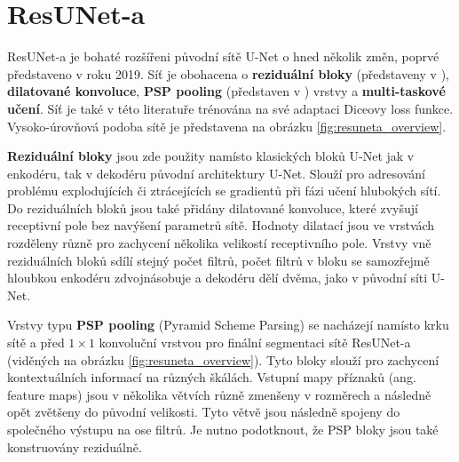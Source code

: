 \section{ResUNet-a}
\label{sec:Chapter25}

ResUNet-a je bohaté rozšířeni původní sítě U-Net o hned několik změn, poprvé představeno v \cite{resuneta} roku 2019. Síť je obohacena o \textbf{reziduální bloky} (představeny v \cite{residualblocks}), \textbf{dilatované konvoluce}, \textbf{PSP pooling} (představen v \cite{psp}) vrstvy a \textbf{multi-taskové učení}. Síť je také v této literatuře trénována na své adaptaci Diceovy loss funkce. Vysoko-úrovňová podoba sítě je představena na obrázku \ref{fig:resuneta_overview}.

\textbf{Reziduální bloky} jsou zde použity namísto klasických bloků U-Net jak v enkodéru, tak v dekodéru původní architektury U-Net. Slouží pro adresování problému explodujících či ztrácejících se gradientů při fázi učení hlubokých sítí. Do reziduálních bloků jsou také přidány dilatované konvoluce, které zvyšují receptivní pole bez navýšení parametrů sítě. Hodnoty dilatací jsou ve vrstvách rozděleny různě pro zachycení několika velikostí receptivního pole. Vrstvy vně reziduálních bloků sdílí stejný počet filtrů, počet filtrů v bloku se samozřejmě hloubkou enkodéru zdvojnásobuje a dekodéru dělí dvěma, jako v původní síti U-Net.

Vrstvy typu \textbf{PSP pooling} (Pyramid Scheme Parsing) se nacházejí namísto krku sítě a před $1\times1$ konvoluční vrstvou pro finální segmentaci sítě ResUNet-a (viděných na obrázku \ref{fig:resuneta_overview}). Tyto bloky slouží pro zachycení kontextuálních informací na různých škálách. Vstupní mapy příznaků (ang. feature maps) jsou v několika větvích různě zmenšeny v rozměrech a následně opět zvětšeny do původní velikosti. Tyto větvě jsou následně spojeny do společného výstupu na ose filtrů. Je nutno podotknout, že PSP bloky jsou také konstruovány reziduálně.


